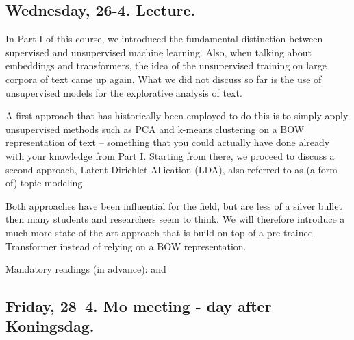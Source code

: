 \subsection*{Wednesday, 26-4. Lecture.}


In Part I of this course, we introduced the fundamental distinction between supervised and unsupervised machine learning. Also, when talking about embeddings and transformers, the idea of the unsupervised training on large corpora of text came up again. What we did not discuss so far is the use of unsupervised models for the explorative analysis of text.

A first approach that has historically been employed to do this is to simply apply unsupervised methods such as PCA and k-means clustering on a BOW representation of text -- something that you could actually have done already with your knowledge from Part I. Starting from there, we proceed to discuss a second approach, Latent Dirichlet Allication (LDA), also referred to as (a form of) topic modeling.

Both approaches have been influential for the field, but are less of a silver bullet then many students and researchers seem to think. We will therefore introduce a much more state-of-the-art approach that is build on top of a pre-trained Transformer instead of relying on a BOW representation.


Mandatory readings (in advance): \cite{Maier2018a} and  \cite{Grootendorst2022}







\subsection*{Friday, 28--4. Mo meeting - day after Koningsdag.}










